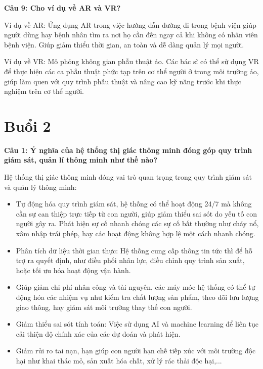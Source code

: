 \textbf{Câu 9: Cho ví dụ về AR và VR?}

Ví dụ về AR: Ứng dụng AR trong việc hướng dẫn đường đi trong bệnh viện giúp người dùng hay bệnh nhân tìm ra nơi họ cần đến ngay cả khi không có nhân viên bệnh viện. Giúp giảm thiểu thời gian, an toàn và dễ dàng quản lý mọi người.

Ví dụ về VR: Mô phỏng không gian phẫu thuật ảo. Các bác sĩ có thể sử dụng VR để thực hiện các ca phẫu thuật phức tạp trên cơ thể người ở trong môi trường ảo, giúp làm quen với quy trình phẫu thuật và nâng cao kỹ năng trước khi thực nghiệm trên cơ thể người.

\section{Buổi 2}

\textbf{Câu 1: Ý nghĩa của hệ thống thị giác thông minh đóng góp quy trình giám sát, quản lí thông minh như thế nào?}

Hệ thống thị giác thông minh đóng vai trò quan trọng trong quy trình giám sát và quản lý thông minh:

\begin{itemize}
	\item Tự động hóa quy trình giám sát, hệ thống có thể hoạt động 24/7 mà không cần sự can thiệp trực tiếp từ con người, giúp giảm thiểu sai sót do yếu tố con người gây ra. Phát hiện sự cố nhanh chóng các sự cố bất thường như cháy nổ, xâm nhập trái phép, hay các hoạt động không hợp lệ một cách nhanh chóng.
	
	\item Phân tích dữ liệu thời gian thực: Hệ thống cung cấp thông tin tức thì để hỗ trợ ra quyết định, như điều phối nhân lực, điều chỉnh quy trình sản xuất, hoặc tối ưu hóa hoạt động vận hành.
	
	\item Giúp giảm chi phí nhân công và tài nguyên, các máy móc hệ thống có thể tự động hóa các nhiệm vụ như kiểm tra chất lượng sản phẩm, theo dõi lưu lượng giao thông, hay giám sát môi trường thay thế con người.
	
	\item Giảm thiểu sai sót tính toán: Việc sử dụng AI và machine learning để liên tục cải thiện độ chính xác của các dự đoán và phát hiện.
	
	\item Giảm rủi ro tai nạn, hạn giúp con người hạn chế tiếp xúc với môi trường độc hại như khai thác mỏ, sản xuất hóa chất, xử lý rác thải độc hại,...
\end{itemize}

